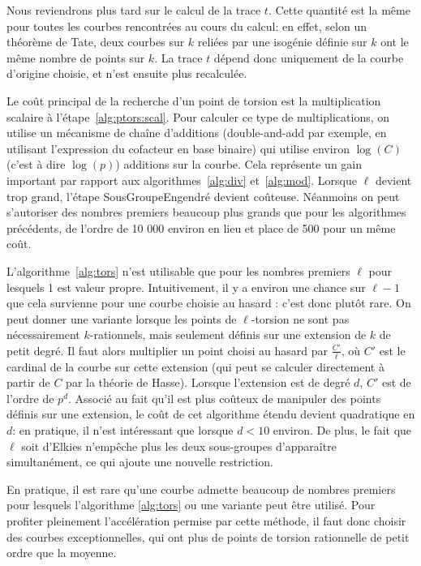\documentclass[11pt,a4paper]{article}
\renewcommand{\v}{\vspace{5mm}}
\theoremstyle{definition}
\begin{document}
Nous reviendrons plus tard sur le calcul de la trace $t$. Cette quantité est la même pour toutes les courbes rencontrées au cours du calcul: en effet, selon un théorème de Tate, deux courbes sur $k$ reliées par une isogénie définie sur $k$ ont le même nombre de points sur $k$. La trace $t$ dépend donc uniquement de la courbe d'origine choisie, et n'est ensuite plus recalculée.

Le coût principal de la recherche d'un point de torsion est la multiplication scalaire à l'étape~\ref{alg:ptors:scal}. Pour calculer ce type de multiplications, on utilise un mécanisme de chaîne d'additions (double-and-add par exemple, en utilisant l'expression du cofacteur en base binaire) qui utilise environ $\log(C)$ (c'est à dire $\log(p)$) additions sur la courbe. Cela représente un gain important par rapport aux algorithmes~\ref{alg:div} et~\ref{alg:mod}. Lorsque $\ell$ devient trop grand, l'étape {\sc SousGroupeEngendré} devient coûteuse. Néanmoins on peut s'autoriser des nombres premiers beaucoup plus grands que pour les algorithmes précédents, de l'ordre de 10 000 environ en lieu et place de 500 pour un même coût.
\v

L'algorithme~\ref{alg:tors} n'est utilisable que pour les nombres premiers $\ell$ pour lesquels 1 est valeur propre. Intuitivement, il y a environ une chance sur $\ell - 1$ que cela survienne pour une courbe choisie \og au hasard \fg : c'est donc plutôt rare. On peut donner une variante lorsque les points de $\ell$-torsion ne sont pas nécessairement $k$-rationnels, mais seulement définis sur une extension de $k$ de petit degré. Il faut alors multiplier un point choisi au hasard par $\frac{C'}{\ell}$, où $C'$ est le cardinal de la courbe sur cette extension (qui peut se calculer directement à partir de $C$ par la théorie de Hasse). Lorsque l'extension est de degré $d$, $C'$ est de l'ordre de $p^d$. Associé au fait qu'il est plus coûteux de manipuler des points définis sur une extension, le coût de cet algorithme étendu devient quadratique en $d$: en pratique, il n'est intéressant que lorsque $d<10$ environ. De plus, le fait que $\ell$ soit d'Elkies n'empêche plus les deux sous-groupes d'apparaître simultanément, ce qui ajoute une nouvelle restriction.

En pratique, il est rare qu'une courbe admette beaucoup de nombres premiers pour lesquels l'algorithme \ref{alg:tors} ou une variante peut être utilisé. Pour profiter pleinement l'accélération permise par cette méthode, il faut donc choisir des courbes exceptionnelles, qui ont plus de points de torsion rationnelle de petit ordre que la moyenne.
\end{document}
